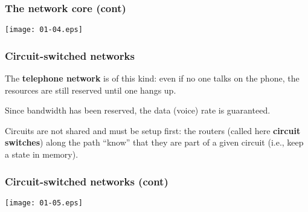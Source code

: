 %
\begin{frame}
\frametitle{The network core (cont)}

\begin{center}
  \texttt{[image: 01-04.eps]}
\end{center}

\end{frame}

%
\begin{frame}
\frametitle{Circuit-switched networks}

The \textbf{telephone network} is of this kind: even if no one talks
on the phone, the resources are still reserved until one hangs up.

\bigskip

Since bandwidth has been reserved, the data (voice) rate is
guaranteed.

\bigskip

Circuits are not shared and must be setup first: the routers (called
here \textbf{circuit switches}) along the path ``know'' that they are
part of a given circuit (i.e., keep a state in memory).

\end{frame}

%
\begin{frame}
\frametitle{Circuit-switched networks (cont)}

\begin{center}
  \texttt{[image: 01-05.eps]}
\end{center}

\end{frame}

